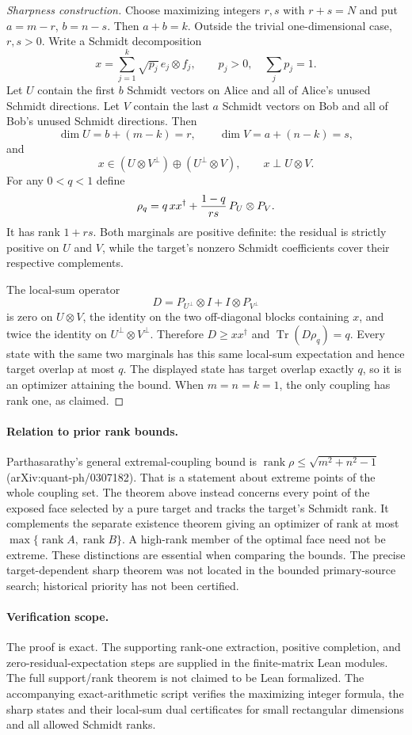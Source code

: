 \begin{proof}[Sharpness construction]
Choose maximizing integers $r,s$ with $r+s=N$ and put
$a=m-r$, $b=n-s$. Then $a+b=k$. Outside the trivial one-dimensional
case, $r,s>0$. Write a Schmidt decomposition
\[
 x=\sum_{j=1}^{k}\sqrt{p_j}\,e_j\otimes f_j,
 \qquad p_j>0,\quad\sum_jp_j=1.
\]
Let $U$ contain the first $b$ Schmidt vectors on Alice and all of Alice's
unused Schmidt directions. Let $V$ contain the last $a$ Schmidt vectors
on Bob and all of Bob's unused Schmidt directions. Then
\[
 \dim U=b+(m-k)=r,\qquad \dim V=a+(n-k)=s,
\]
and
\[
 x\in(U\otimes V^\perp)\oplus(U^\perp\otimes V),
 \qquad x\perp U\otimes V.
\]
For any $0<q<1$ define
\[
 \rho_q=q\,xx^\dagger+{1-q\over rs}\,P_U\otimes P_V.
\]
It has rank $1+rs$. Both marginals are positive definite: the residual
is strictly positive on $U$ and $V$, while the target's nonzero Schmidt
coefficients cover their respective complements.

The local-sum operator
\[
          D=P_{U^\perp}\otimes I+I\otimes P_{V^\perp}
\]
is zero on $U\otimes V$, the identity on the two off-diagonal blocks
containing $x$, and twice the identity on
$U^\perp\otimes V^\perp$. Therefore $D\ge xx^\dagger$ and
$\operatorname{Tr}(D\rho_q)=q$. Every state with the same two marginals
has this same local-sum expectation and hence target overlap at most
$q$. The displayed state has target overlap exactly $q$, so it is an
optimizer attaining the bound. When $m=n=k=1$, the only coupling has
rank one, as claimed.
\end{proof}

\paragraph{Relation to prior rank bounds.}
Parthasarathy's general extremal-coupling bound is
$\operatorname{rank}\rho\le\sqrt{m^2+n^2-1}$
(arXiv:quant-ph/0307182). That is a statement about extreme points of the
whole coupling set. The theorem above instead concerns every point of
the exposed face selected by a pure target and tracks the target's Schmidt
rank. It complements the separate existence theorem giving an optimizer
of rank at most $\max\{\operatorname{rank}A,\operatorname{rank}B\}$. A high-rank member of the optimal face need not
be extreme. These distinctions are essential when comparing the bounds.
The precise target-dependent sharp theorem was not located in the bounded
primary-source search; historical priority has not been certified.

\paragraph{Verification scope.}
The proof is exact. The supporting rank-one extraction, positive completion,
and zero-residual-expectation steps are supplied in the finite-matrix Lean
modules. The full support/rank theorem is not claimed to be Lean formalized.
The accompanying exact-arithmetic script verifies the maximizing integer
formula, the sharp states and their local-sum dual certificates for small
rectangular dimensions and all allowed Schmidt ranks.

